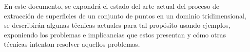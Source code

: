 %
En este documento, se expondrá el estado del arte actual del proceso de extracción de 
superficies de un conjunto de puntos en un dominio tridimensional, se describirán algunas 
técnicas actuales para tal propósito usando ejemplos, exponiendo los problemas e implicancias 
que estos presentan y cómo otras técnicas intentan resolver aquellos problemas.
